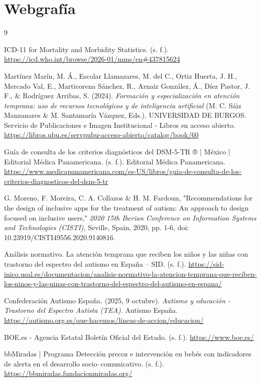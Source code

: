 \documentclass{article}
\begin{document}
\section{\textbf{Webgrafía}}
\begin{thebibliography}{9}

ICD-11 for Mortality and Morbidity Statistics. (s. f.). \url{https://icd.who.int/browse/2026-01/mms/en#437815624}

Martínez Marín, M. Á., Escolar Llamazares, M. del C., Ortiz Huerta, J. H., Mercado Val, E., Marticorena Sánchez, R., Arnaiz González, Á., Díez Pastor, J. F., \& Rodríguez Arribas, S. (2024). \textit{Formación y especialización en atención temprana: uso de recursos tecnológicos y de inteligencia artificial} (M. C. Sáiz Manzanares \& M. Santamaría Vázquez, Eds.). UNIVERSIDAD DE BURGOS. Servicio de Publicaciones e Imagen Institucional - Libros en acceso abierto. \url{https://libros.ubu.es/servpubu-acceso-abierto/catalog/book/60}

Guía de consulta de los criterios diagnósticos del DSM-5-TR ® | México | Editorial Médica Panamericana. (s. f.). Editorial Médica Panamericana. \url{https://www.medicapanamericana.com/es-US/libros/guia-de-consulta-de-los-criterios-diagnosticos-del-dsm-5-tr}

G. Moreno, F. Moreira, C. A. Collazos \& H. M. Fardoun, "Recommendations for the design of inclusive apps for the treatment of autism: An approach to design focused on inclusive users," \textit{2020 15th Iberian Conference on Information Systems and Technologies (CISTI)}, Seville, Spain, 2020, pp. 1-6, doi: 10.23919/CISTI49556.2020.9140816.

Análisis normativo. La atención temprana que reciben los niños y las niñas con trastorno del espectro del autismo en España – SID. (s. f.). \url{https://sid-inico.usal.es/documentacion/analisis-normativo-la-atencion-temprana-que-reciben-los-ninos-y-las-ninas-con-trastorno-del-espectro-del-autismo-en-espana/}

Confederación Autismo España. (2025, 9 octubre). \textit{Autismo y educación - Trastorno del Espectro Autista (TEA)}. Autismo España. \url{https://autismo.org.es/que-hacemos/lineas-de-accion/educacion/}

BOE.es - Agencia Estatal Boletín Oficial del Estado. (s. f.). \url{https://www.boe.es/}

bbMiradas | Programa Detección precoz e intervención en bebés con indicadores de alerta en el desarrollo socio–comunicativo. (s. f.). \url{https://bbmiradas.fundacionmiradas.org/}


\end{thebibliography}
\end{document}
